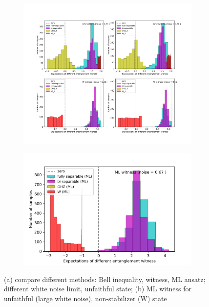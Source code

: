 \documentclass[
reprint,
aps,
pra,
floatfix,
]{revtex4-2}
\theoremstyle{plain}
\theoremstyle{definition}
\begin{document}
\begin{figure}[!ht]
	\centering
	\begin{subfigure}{0.45\textwidth}
	\centering
		\includegraphics[width=.9\linewidth]{./Code/fidelity_witness_compare.png}
	\end{subfigure}
	\begin{subfigure}{0.45\textwidth}
	\centering
		\includegraphics[width=.9\linewidth]{./Code/three_qubit_hist_ML.png}
	\end{subfigure}
	\caption{(a) compare different methods: Bell inequality, witness, ML ansatz; different white noise limit, unfaithful state; (b) ML witness for unfaithful (large white noise), non-stabilizer (W) state}
\end{figure}
\end{document}
